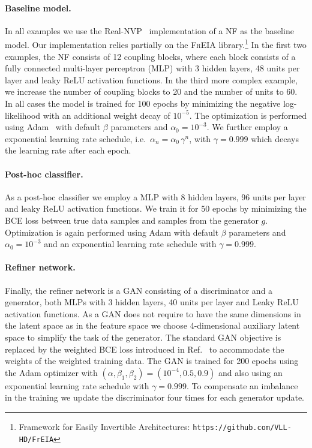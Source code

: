 \paragraph{Baseline model.}
In all examples we use the Real-NVP~\cite{RNVP2019} implementation of a NF as the baseline model. Our implementation relies partially on the \textsc{FrEIA} library.\footnote{Framework for Easily Invertible Architectures: \texttt{https://github.com/VLL-HD/FrEIA}}
In the first two examples, the NF consists of 12 coupling blocks, where each block consists of a fully connected multi-layer perceptron (MLP) with 3 hidden layers, 48 units per layer and leaky ReLU activation functions. In the third more complex example, we increase the number of coupling blocks to 20 and the number of units to 60. In all cases the model is trained for 100 epochs by minimizing the negative log-likelihood with an additional weight decay of $10^{-5}$. The optimization is performed using Adam~\cite{Adam2019} with default $\beta$ parameters and $\alpha_0 = 10^{-3}$. We further employ a exponential learning rate schedule, i.e.\ $\alpha_n = \alpha_0\,\gamma^n$,
with $\gamma = 0.999$ which decays the learning rate after each epoch.

\paragraph{Post-hoc classifier.}
As a post-hoc classifier we employ a MLP with 8 hidden layers, 96 units per layer and leaky ReLU activation functions. We train it for 50 epochs by minimizing the BCE loss between true data samples and samples from the generator $g$. Optimization is again performed using Adam with default $\beta$ parameters and $\alpha_0 = 10^{-3}$ and an exponential learning rate schedule with $\gamma = 0.999$.

\paragraph{Refiner network.}
Finally, the refiner network is a GAN consisting of a discriminator and a generator, both MLPs with 3 hidden layers, 40 units per layer and Leaky ReLU activation functions.
As a GAN does not require to have the same dimensions in the latent space as in the feature space we choose 4-dimensional auxiliary latent space to simplify the task of the generator. The standard GAN objective is replaced by the weighted BCE loss introduced in Ref.~\cite{Backes:2020vka} to accommodate the weights of the weighted training data. The GAN is trained for 200 epochs using the Adam optimizer with $(\alpha, \beta_1, \beta_2) = (10^{-4}, 0.5, 0.9)$ and also using an exponential learning rate schedule with $\gamma = 0.999$. To compensate an imbalance in the training we update the discriminator four times for each generator update.

